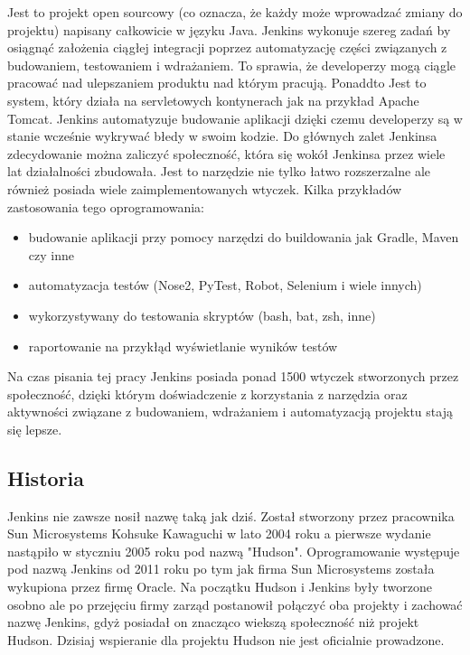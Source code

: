 Jest to projekt open sourcowy (co oznacza, że każdy może wprowadzać zmiany do projektu) napisany całkowicie w języku Java. Jenkins wykonuje szereg zadań by osiągnąć założenia ciągłej integracji poprzez automatyzację części związanych z budowaniem, testowaniem i wdrażaniem. To sprawia, że developerzy mogą ciągle pracować nad ulepszaniem produktu nad którym pracują. Ponaddto Jest to system, który działa na servletowych kontynerach jak na przykład Apache Tomcat. 
Jenkins automatyzuje budowanie aplikacji dzięki czemu developerzy są w stanie wcześnie wykrywać błedy w swoim kodzie. Do głównych zalet Jenkinsa zdecydowanie można zaliczyć społeczność, która się wokół Jenkinsa przez wiele lat działalności zbudowała. Jest to narzędzie nie tylko łatwo rozszerzalne ale również posiada wiele zaimplementowanych wtyczek. 
Kilka przykładów zastosowania tego oprogramowania:
\begin{itemize}
    \item budowanie aplikacji przy pomocy narzędzi do buildowania jak Gradle, Maven czy inne 
    \item automatyzacja testów  (Nose2, PyTest, Robot, Selenium i wiele innych)
    \item wykorzystywany do testowania skryptów (bash, bat, zsh, inne)
    \item raportowanie na przykłąd wyświetlanie wyników testów
\end{itemize}

Na czas pisania tej pracy Jenkins posiada ponad 1500 wtyczek stworzonych przez społeczność, dzięki którym doświadczenie z korzystania z narzędzia oraz aktywności związane z budowaniem, wdrażaniem i automatyzacją projektu stają się lepsze. 

\subsection{Historia}

Jenkins nie zawsze nosił nazwę taką jak dziś. Został stworzony przez pracownika Sun Microsystems Kohsuke Kawaguchi w lato 2004 roku a pierwsze wydanie nastąpiło w styczniu 2005 roku pod nazwą "Hudson". Oprogramowanie występuje pod nazwą Jenkins od 2011 roku po tym jak firma Sun Microsystems została wykupiona przez firmę Oracle. Na początku Hudson i Jenkins były tworzone osobno ale po przejęciu firmy zarząd postanowił połączyć oba projekty i zachować nazwę Jenkins, gdyż posiadał on znacząco wiekszą społeczność niż projekt Hudson. Dzisiaj wspieranie dla projektu Hudson nie jest oficialnie prowadzone. 

